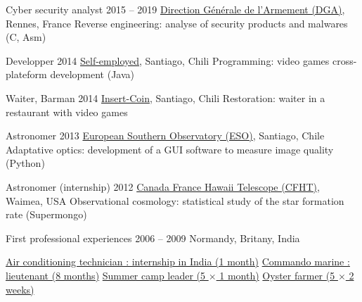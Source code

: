 \begin{joblist}[12.8][8.4][4]

\setlength{\parskip}{0.3cm}
\vspace{-0.4cm}

\item[Cyber security analyst]{2015 -- 2019}
  {
  \href{http://www.defense.gouv.fr/dga/}{Direction Générale de l'Armement (DGA)}, Rennes, France
  }
  {Reverse engineering: analyse of security products and malwares (C, Asm)}


\item[Developper]{2014}
  {
  \href{https://play.google.com/store/apps/developer?id=tinmarino&hl=en}{Self-employed}, Santiago, Chili
  }
  {Programming: video games cross-plateform development (Java)}


\item[Waiter, Barman]{2014}
  {
  \href{http://www.insertcoin.cl/}{Insert-Coin}, Santiago, Chili
  }
  {Restoration: waiter in a restaurant with video games}


\item[Astronomer]{2013}
  {
  \href{http://www.eso.org/public/}{European Southern Observatory (ESO)}, Santiago, Chile
  }
  {Adaptative optics: development of a GUI software to measure image quality (Python)}

\item[Astronomer (internship)]{2012}
	{
\href{https://www.cfht.hawaii.edu/}{Canada France Hawaii Telescope (CFHT)}, Waimea, USA
  }
  {Observational cosmology: statistical study of the star formation rate (Supermongo)}

  
\item[First professional experiences]{2006 -- 2009}
	{
	Normandy, Britany, India
	}
	{
    \renewcommand\labelitemi{{}}
		\vspace{-0.8cm}
    \setlength{\parskip}{0cm}
		\begin{itemize}
		\setlength\itemsep{0cm}
    \cvitem \href{http://www.dupont.co.in/}{ Air conditioning technician : internship in India (1 month)}
    \cvitem \href{http://www.defense.gouv.fr/marine/organisation/forces/fusiliers-marins-et-commandos/force-maritime-des-fusiliers-marins-et-commandos}{ Commando marine : lieutenant (8 months)}
    \cvitem \href{http://www.vacances-pour-tous.org/}{ Summer camp leader (5 $\times$ 1 month)}
    \cvitem \href{http://huitresdesaintvaast.fr/}{ Oyster farmer (5 $\times$ 2 weeks)}
		\end{itemize}
  }

\end{joblist}


